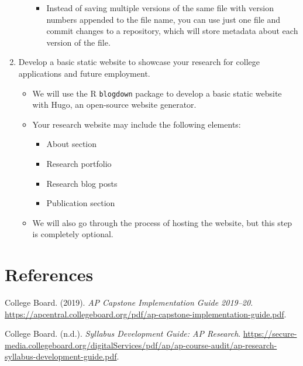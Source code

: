\documentclass[11pt,]{article}
\providecommand{\tightlist}{%
  \setlength{\itemsep}{0pt}\setlength{\parskip}{0pt}}
\begin{document}
\begin{enumerate}
\begin{itemize}
    \begin{itemize}
    \tightlist
    \item
      Instead of saving multiple versions of the same file with version numbers appended to the file name, you can use just one file and commit changes to a repository, which will store metadata about each version of the file.
    \end{itemize}
  \end{itemize}
\item
  Develop a basic static website to showcase your research for college applications and future employment.

  \begin{itemize}
  \tightlist
  \item
    We will use the R \texttt{blogdown} package to develop a basic static website with Hugo, an open-source website generator.
  \item
    Your research website may include the following elements:

    \begin{itemize}
    \tightlist
    \item
      About section
    \item
      Research portfolio
    \item
      Research blog posts
    \item
      Publication section
    \end{itemize}
  \item
    We will also go through the process of hosting the website, but this step is completely optional.
  \end{itemize}
\end{enumerate}

\newpage

\hypertarget{references}{%
\section*{References}\label{references}}

\setlength{\parindent}{-0.2in}
\setlength{\leftskip}{0.2in}
\setlength{\parskip}{8pt}

\noindent

\hypertarget{refs}{}
\leavevmode\hypertarget{ref-cb}{}%
College Board. (2019). \emph{AP Capstone Implementation Guide 2019--20}. \url{https://apcentral.collegeboard.org/pdf/ap-capstone-implementation-guide.pdf}.

\leavevmode\hypertarget{ref-syllabus}{}%
College Board. (n.d.). \emph{Syllabus Development Guide: AP Research}. \url{https://secure-media.collegeboard.org/digitalServices/pdf/ap/ap-course-audit/ap-research-syllabus-development-guide.pdf}.

\printindex
\end{document}

